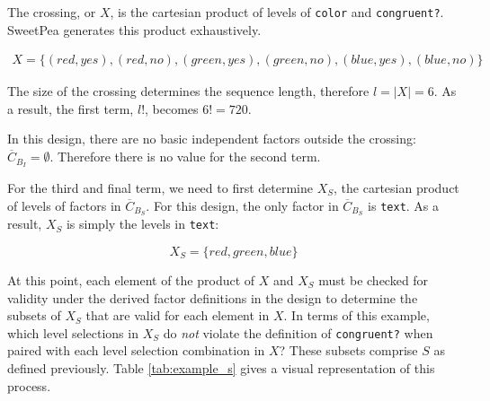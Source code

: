 The crossing, or $X$, is the cartesian product of levels of \texttt{color} and \texttt{congruent?}. SweetPea generates this product exhaustively.

\begin{align*}
X = \{(red, yes), (red, no), (green, yes), (green, no), (blue, yes), (blue, no)\}
\end{align*}

The size of the crossing determines the sequence length, therefore $l = |X| = 6$. As a result, the first term, $l!$, becomes $6! = 720$.

In this design, there are no basic independent factors outside the crossing: $\overline{C}_{B_I} = \emptyset$. Therefore there is no value for the second term.

For the third and final term, we need to first determine $X_S$, the cartesian product of levels of factors in $\overline{C}_{B_S}$. For this design, the only factor in $\overline{C}_{B_S}$ is \texttt{text}. As a result, $X_S$ is simply the levels in \texttt{text}:

\[
X_S = \{red, green, blue\}
\]

At this point, each element of the product of $X$ and $X_S$ must be checked for validity under the derived factor definitions in the design to determine the subsets of $X_S$ that are valid for each element in $X$. In terms of this example, which level selections in $X_S$ do \textit{not} violate the definition of \texttt{congruent?} when paired with each level selection combination in $X$? These subsets comprise $S$ as defined previously. Table \ref{tab:example_s} gives a visual representation of this process.


